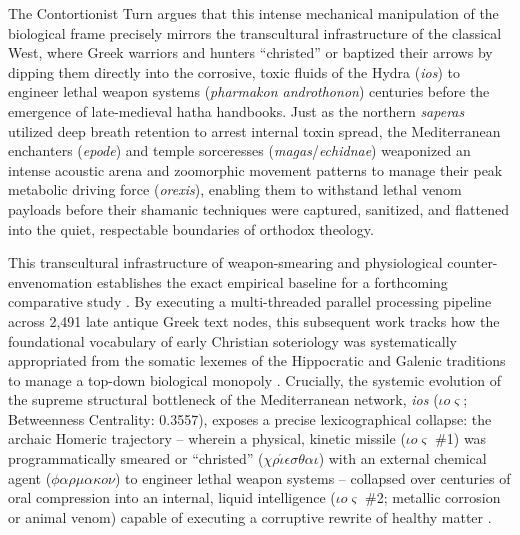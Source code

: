 \documentclass[11pt,twoside,letterpaper]{article}
\begin{document}
The Contortionist Turn argues that this intense mechanical manipulation of the biological frame precisely mirrors the transcultural infrastructure of the classical West, where Greek warriors and hunters ``christed'' or baptized their arrows by dipping them directly into the corrosive, toxic fluids of the Hydra (\textit{ios}) to engineer lethal weapon systems (\textit{pharmakon androthonon}) centuries before the emergence of late-medieval hatha handbooks. Just as the northern \textit{saperas} utilized deep breath retention to arrest internal toxin spread, the Mediterranean enchanters (\textit{epode}) and temple sorceresses (\textit{magas}/\textit{echidnae}) weaponized an intense acoustic arena and zoomorphic movement patterns to manage their peak metabolic driving force (\textit{orexis}), enabling them to withstand lethal venom payloads before their shamanic techniques were captured, sanitized, and flattened into the quiet, respectable boundaries of orthodox theology.

This transcultural infrastructure of weapon-smearing and physiological counter-envenomation establishes the exact empirical baseline for a forthcoming comparative study \citep{McCartneyForthcomingDomingD}. By executing a multi-threaded parallel processing pipeline across 2,491 late antique Greek text nodes, this subsequent work tracks how the foundational vocabulary of early Christian soteriology was systematically appropriated from the somatic lexemes of the Hippocratic and Galenic traditions to manage a top-down biological monopoly \citep{McCartneyForthcomingDomingD}. Crucially, the systemic evolution of the supreme structural bottleneck of the Mediterranean network, \textit{ios} ($\iota\mathit{o}\varsigma$; Betweenness Centrality: 0.3557), exposes a precise lexicographical collapse: the archaic Homeric trajectory -- wherein a physical, kinetic missile ($\iota\mathit{o}\varsigma$ \#1) was programmatically smeared or ``christed'' ($\chi\rho\mathit{\acute{\iota}}\epsilon\sigma\theta\alpha\iota$) with an external chemical agent ($\phi\alpha\rho\mu\alpha\kappa\mathit{o}\nu$) to engineer lethal weapon systems -- collapsed over centuries of oral compression into an internal, liquid intelligence ($\iota\mathit{o}\varsigma$ \#2; metallic corrosion or animal venom) capable of executing a corruptive rewrite of healthy matter \citep{McCartneyForthcomingDomingD}. 
\end{document}
